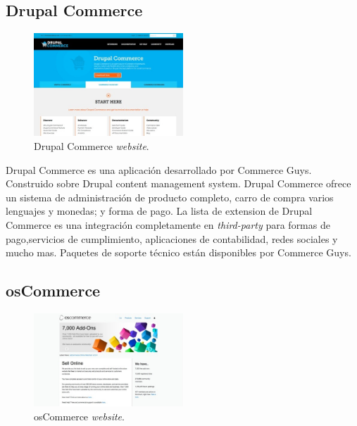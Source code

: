 \newcommand{\nameDrupalCommerce}{Drupal Commerce }
\subsection{\nameDrupalCommerce}

\begin{figure}[h!]
	\centering
	\includegraphics[width=0.5\textwidth]{figuras/cap1/DrupalCommerceWebsite.jpg}
	\caption{\nameDrupalCommerce \textit{website}\cite{online_DrupalCommerce}.}
\end{figure}	

\nameDrupalCommerce es una aplicación \ecommerce desarrollado por Commerce Guys. Construido sobre Drupal content management system. \nameDrupalCommerce ofrece un sistema de administración de producto completo, carro de compra varios lenguajes y monedas; y forma de pago. La lista de extension de \nameDrupalCommerce es una integración completamente en\textit{ third-party} para formas de pago,servicios de cumplimiento, aplicaciones de contabilidad, redes sociales y mucho mas. Paquetes de soporte técnico están disponibles por Commerce Guys.

\newcommand{\nameOsCommerce}{osCommerce }
\subsection{\nameOsCommerce}

\begin{figure}[h!]
	\centering
	\includegraphics[width=0.5\textwidth]{figuras/cap1/osCommerceWebsite.jpg}
	\caption{\nameOsCommerce \textit{website}\cite{online_osCommerce}.}
\end{figure}

